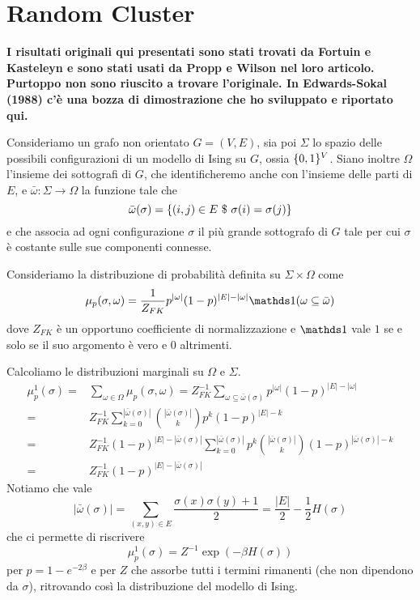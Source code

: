 \documentclass[]{marticle}
\begin{document}
\section{Random Cluster}

\textbf{I risultati originali qui presentati sono stati trovati da Fortuin e
Kasteleyn e sono stati usati da Propp e Wilson nel loro articolo. Purtoppo non
sono riuscito a trovare l'originale. In Edwards-Sokal (1988) c'\`e una bozza di
dimostrazione che ho sviluppato e riportato qui.}

Consideriamo un grafo non orientato $G=(V,E)$, sia poi $\Sigma$ lo spazio delle
possibili configurazioni di un modello di Ising su $G$, ossia $\{0,1\}^V$.
Siano inoltre $\Omega$ l'insieme dei sottografi di $G$, che identificheremo
anche con l'insieme delle parti di $E$, e $\bar{\omega}\colon \Sigma
\longrightarrow \Omega$ la funzione tale che 
\[
    \bar{\omega}(\sigma) = \{(i,j)\in E \ \$\  \sigma(i) = \sigma(j)\}
\]
e che associa ad ogni configurazione $\sigma$ il pi\`u grande sottografo di $G$
tale per cui $\sigma$ \`e costante sulle sue componenti connesse.

Consideriamo la distribuzione di probabilit\`a definita su $\Sigma \times
\Omega$ come
\[
    \mu_p(\sigma, \omega) = \frac{1}{Z_{FK}} p^{|\omega|} (1-p)^{|E| - |\omega|}
    \ind(\omega \subseteq \bar{\omega})
\]
dove $Z_{FK}$ \`e un opportuno coefficiente di normalizzazione e $\ind$ vale $1$ se
e solo se il suo argomento \`e vero e $0$ altrimenti.

Calcoliamo le distribuzioni marginali su $\Omega$ e $\Sigma$.
\begin{align*}
    \mu^1_p(\sigma) =& \sum_{\omega\in\Omega} \mu_p(\sigma,\omega) = 
    Z_{FK}^{-1} \sum_{\omega\subseteq\bar{\omega}(\sigma)}  p^{|\omega|}
    (1-p)^{|E| - |\omega|} \\
    =& Z_{FK}^{-1} \sum_{k=0}^{|\bar{\omega}(\sigma)|}
        \binom{|\bar{\omega}(\sigma)|}{k}
        p^k (1-p)^{|E| - k} \\
    =& Z_{FK}^{-1} (1-p)^{|E|-|\bar{\omega}(\sigma)|}
        \sum_{k=0}^{|\bar{\omega}(\sigma)|}  p^k
        \binom{|\bar{\omega}(\sigma)|}{k}
        (1-p)^{|\bar{\omega}(\sigma)| - k} \\
    =& Z_{FK}^{-1} (1-p)^{|E|-|\bar{\omega}(\sigma)|}
\end{align*}
Notiamo che vale
\[
    |\bar{\omega}(\sigma)| = \sum_{(x,y)\in E} \frac{\sigma(x) \sigma(y) +
    1}{2} = \frac{|E|}{2} - \frac{1}{2}H(\sigma)
\]
che ci permette di riscrivere
\[
    \mu^1_p(\sigma) = Z^{-1} \exp(-\beta H(\sigma))
\]
per $p = 1-e^{-2\beta}$ e per $Z$ che assorbe tutti i termini rimanenti (che non
dipendono da $\sigma$), ritrovando cos\`i la distribuzione del modello di Ising.
\end{document}
